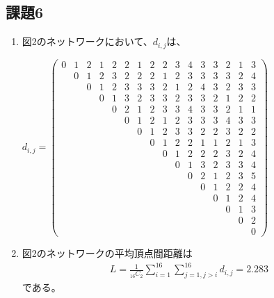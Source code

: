 \documentclass[12pt]{jarticle}
\begin{document}
\subsection{課題6}
\begin{enumerate}
    \item 図2のネットワークにおいて、$d_{i,j}$は、
          \begin{center}
              \(
              d_{i,j} = \left(
              \begin{array}{cccccccccccccccc}
                      0 & 1 & 2 & 1 & 2 & 2 & 1 & 2 & 2 & 3 & 4 & 3 & 3 & 2 & 1 & 3 \\
                        & 0 & 1 & 2 & 3 & 2 & 2 & 2 & 1 & 2 & 3 & 3 & 3 & 3 & 2 & 4 \\
                        &   & 0 & 1 & 2 & 3 & 3 & 3 & 2 & 1 & 2 & 4 & 3 & 2 & 3 & 3 \\
                        &   &   & 0 & 1 & 3 & 2 & 3 & 3 & 2 & 3 & 3 & 2 & 1 & 2 & 2 \\
                        &   &   &   & 0 & 2 & 1 & 2 & 3 & 3 & 4 & 3 & 3 & 2 & 1 & 1 \\
                        &   &   &   &   & 0 & 1 & 2 & 1 & 2 & 3 & 3 & 3 & 4 & 3 & 3 \\
                        &   &   &   &   &   & 0 & 1 & 2 & 3 & 3 & 2 & 2 & 3 & 2 & 2 \\
                        &   &   &   &   &   &   & 0 & 1 & 2 & 2 & 1 & 1 & 2 & 1 & 3 \\
                        &   &   &   &   &   &   &   & 0 & 1 & 2 & 2 & 2 & 3 & 2 & 4 \\
                        &   &   &   &   &   &   &   &   & 0 & 1 & 3 & 2 & 3 & 3 & 4 \\
                        &   &   &   &   &   &   &   &   &   & 0 & 2 & 1 & 2 & 3 & 5 \\
                        &   &   &   &   &   &   &   &   &   &   & 0 & 1 & 2 & 2 & 4 \\
                        &   &   &   &   &   &   &   &   &   &   &   & 0 & 1 & 2 & 4 \\
                        &   &   &   &   &   &   &   &   &   &   &   &   & 0 & 1 & 3 \\
                        &   &   &   &   &   &   &   &   &   &   &   &   &   & 0 & 2 \\
                        &   &   &   &   &   &   &   &   &   &   &   &   &   &   & 0
                  \end{array}
              \right)
              \)
          \end{center}
    \item 図2のネットワークの平均頂点間距離は
          \begin{eqnarray*}
              L=\frac{1}{{}_{16} C_{2}} \sum_{i = 1}^{16} \sum_{j = 1,j>i}^{16}d_{i,j} =2.283
          \end{eqnarray*}
          である。
\end{enumerate}
\end{document}
